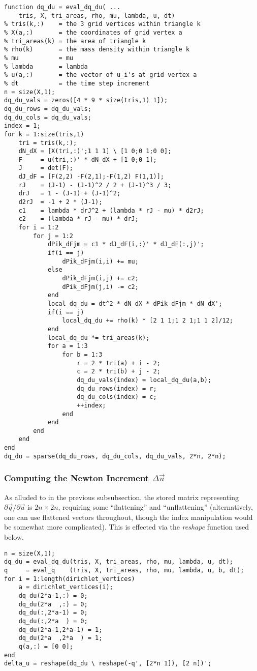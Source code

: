 \begin{verbatim}
function dq_du = eval_dq_du( ...
    tris, X, tri_areas, rho, mu, lambda, u, dt)
% tris(k,:)    = the 3 grid vertices within triangle k
% X(a,:)       = the coordinates of grid vertex a
% tri_areas(k) = the area of triangle k
% rho(k)       = the mass density within triangle k
% mu           = mu
% lambda       = lambda
% u(a,:)       = the vector of u_i's at grid vertex a
% dt           = the time step increment
n = size(X,1);
dq_du_vals = zeros([4 * 9 * size(tris,1) 1]);
dq_du_rows = dq_du_vals;
dq_du_cols = dq_du_vals;
index = 1;
for k = 1:size(tris,1)
    tri = tris(k,:);
    dN_dX = [X(tri,:)';1 1 1] \ [1 0;0 1;0 0];
    F     = u(tri,:)' * dN_dX + [1 0;0 1];
    J     = det(F);
    dJ_dF = [F(2,2) -F(2,1);-F(1,2) F(1,1)];
    rJ    = (J-1) - (J-1)^2 / 2 + (J-1)^3 / 3;
    drJ   = 1 - (J-1) + (J-1)^2;
    d2rJ  = -1 + 2 * (J-1);
    c1    = lambda * drJ^2 + (lambda * rJ - mu) * d2rJ;
    c2    = (lambda * rJ - mu) * drJ;
    for i = 1:2
        for j = 1:2
            dPik_dFjm = c1 * dJ_dF(i,:)' * dJ_dF(:,j)';
            if(i == j)
                dPik_dFjm(i,i) += mu;
            else
                dPik_dFjm(i,j) += c2;
                dPik_dFjm(j,i) -= c2;
            end
            local_dq_du = dt^2 * dN_dX * dPik_dFjm * dN_dX';
            if(i == j)
                local_dq_du += rho(k) * [2 1 1;1 2 1;1 1 2]/12;
            end
            local_dq_du *= tri_areas(k);
            for a = 1:3
                for b = 1:3
                    r = 2 * tri(a) + i - 2;
                    c = 2 * tri(b) + j - 2;
                    dq_du_vals(index) = local_dq_du(a,b);
                    dq_du_rows(index) = r;
                    dq_du_cols(index) = c;
                    ++index;
                end
            end
        end
    end
end
dq_du = sparse(dq_du_rows, dq_du_cols, dq_du_vals, 2*n, 2*n);
\end{verbatim}

\vspace{.5\baselineskip}
\subsubsection{Computing the Newton Increment $\Delta \vec{u}$}

As alluded to in the previous subsubsection, the stored matrix representing $\partial\vec{q}/\partial\vec{u}$ is $2n \times 2n$, requiring some ``flattening'' and ``unflattening'' (alternatively, one can use flattened vectors throughout, though the index manipulation would be somewhat more complicated). This is effected via the \emph{reshape} function used below.
\begin{verbatim}
n = size(X,1);
dq_du = eval_dq_du(tris, X, tri_areas, rho, mu, lambda, u, dt);
q     = eval_q    (tris, X, tri_areas, rho, mu, lambda, u, b, dt);
for i = 1:length(dirichlet_vertices)
    a = dirichlet_vertices(i);
    dq_du(2*a-1,:) = 0;
    dq_du(2*a  ,:) = 0;
    dq_du(:,2*a-1) = 0;
    dq_du(:,2*a  ) = 0;
    dq_du(2*a-1,2*a-1) = 1;
    dq_du(2*a  ,2*a  ) = 1;
    q(a,:) = [0 0];
end
delta_u = reshape(dq_du \ reshape(-q', [2*n 1]), [2 n])';
\end{verbatim}

